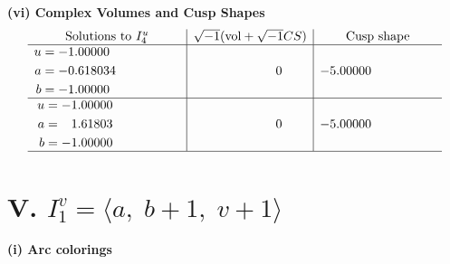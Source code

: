 \documentclass[1p]{elsarticle_modified}
\theoremstyle{definition}
\newcommand{\I}{\sqrt{-1}}
\begin{document}
\newpage\flushleft \textbf{(vi) Complex Volumes and Cusp Shapes}
$$\begin{array}{c|c|c}  
\text{Solutions to }I^u_{4}& \I (\text{vol} + \sqrt{-1}CS) & \text{Cusp shape}\\
 \hline 
\begin{aligned}
u &= -1.00000\phantom{ +0.000000I} \\
a &= -0.618034\phantom{ +0.000000I} \\
b &= -1.00000\phantom{ +0.000000I}\end{aligned}
 & \phantom{-0.000000 } 0 & -5.00000\phantom{ +0.000000I} \\ \hline\begin{aligned}
u &= -1.00000\phantom{ +0.000000I} \\
a &= \phantom{-}1.61803\phantom{ +0.000000I} \\
b &= -1.00000\phantom{ +0.000000I}\end{aligned}
 & \phantom{-0.000000 } 0 & -5.00000\phantom{ +0.000000I}\\
 \hline 
 \end{array}$$\newpage\newpage\renewcommand{\arraystretch}{1}
\centering \section*{V. $I^v_{1}= \langle a,\;b+1,\;v+1 \rangle$}
\flushleft \textbf{(i) Arc colorings}\\
\end{document}
